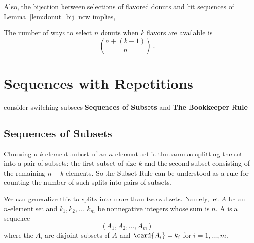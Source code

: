 Also, the bijection between selections of flavored donuts and bit
sequences of Lemma~\ref{lem:donut_bij} now implies,
\begin{corollary}\label{cor:donut_binom}
The number of ways to select $n$ donuts when $k$ flavors are available is
\[
\binom{n + (k - 1)}{n}\ .
\]
\end{corollary}



\begin{problems}
  \practiceproblems

  \classproblems

  \homeworkproblems

  \examproblems

\end{problems}


\section{Sequences with Repetitions}\label{bookkeeper_sec}

\begin{editingnotes}
consider switching subsecs \textbf{Sequences of Subsets} and \textbf{The Bookkeeper Rule}
\end{editingnotes}

\subsection{Sequences of Subsets}

Choosing a $k$-element subset of an $n$-element set is the same as
splitting the set into a pair of subsets: the first subset of size $k$ and
the second subset consisting of the remaining $n-k$ elements.  So the
Subset Rule can be understood as a rule for counting the number of such
splits into pairs of subsets.

We can generalize this to splits into more than two subsets.  Namely, let
$A$ be an $n$-element set and $k_1,k_2, \dots, k_m$ be nonnegative integers
whose sum is $n$.  A  is a
sequence
\[
(A_1, A_2,\dots,A_m)
\]
where the $A_i$ are disjoint subsets of $A$ and $\card{A_i} = k_i$ for
$i=1,\dots,m$.


